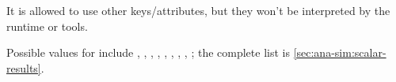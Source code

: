 It is allowed to use other keys/attributes, but they won't be interpreted
by the {\opp} runtime or tools.

Possible values for  include , ,
, , , , , ,
; the complete list is \ref{sec:ana-sim:scalar-results}.


%
%
%
%
%


